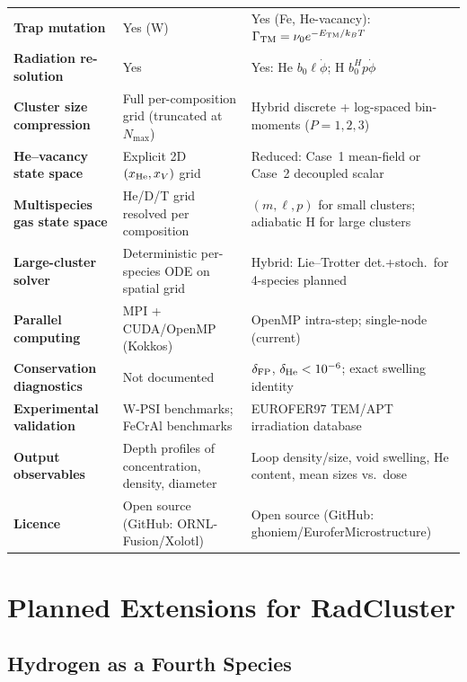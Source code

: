 \documentclass[12pt,letterpaper]{article}
\begin{document}
\begin{longtable}{@{}L{3.4cm} L{4.8cm} L{4.8cm}@{}}
\textbf{Trap mutation}
  & Yes (W)
  & Yes (Fe, He-vacancy): $\Gamma_{\rm TM} = \nu_0 e^{-E_{\rm TM}/k_BT}$ \\[3pt]
\textbf{Radiation re-solution}
  & Yes
  & Yes: He $b_0\ell\dot\phi$; {\color{plancolor}H $b_0^H p\dot\phi$} \\[3pt]
\textbf{Cluster size compression}
  & Full per-composition grid (truncated at $N_{\max}$)
  & Hybrid discrete + log-spaced bin-moments ($P = 1,2,3$) \\[3pt]
\textbf{He--vacancy state space}
  & Explicit 2D $(x_{\rm He},x_V)$ grid
  & Reduced: Case~1 mean-field or Case~2 decoupled scalar \\[3pt]
\textbf{Multispecies gas state space}
  & He/D/T grid resolved per composition
  & {\color{plancolor}$(m,\ell,p)$ for small clusters; adiabatic H for large clusters} \\[3pt]
\textbf{Large-cluster solver}
  & Deterministic per-species ODE on spatial grid
  & {\color{plancolor}Hybrid: Lie--Trotter det.+stoch.\ for 4-species planned} \\[3pt]
\textbf{Parallel computing}
  & MPI + CUDA/OpenMP (Kokkos)
  & OpenMP intra-step; single-node (current) \\[3pt]
\textbf{Conservation diagnostics}
  & Not documented
  & $\delta_{\rm FP}$, $\delta_{\rm He} < 10^{-6}$; exact swelling identity \\[3pt]
\textbf{Experimental validation}
  & W-PSI benchmarks; FeCrAl benchmarks
  & EUROFER97 TEM/APT irradiation database \\[3pt]
\textbf{Output observables}
  & Depth profiles of concentration, density, diameter
  & Loop density/size, void swelling, He content, mean sizes vs.\ dose \\[3pt]
\textbf{Licence}
  & Open source (GitHub: ORNL-Fusion/Xolotl)
  & Open source (GitHub: ghoniem/EuroferMicrostructure) \\
\end{longtable}

\section{Planned Extensions for RadCluster}
\label{sec:plans}

\subsection{Hydrogen as a Fourth Species}
\label{sec:plan_H}
\end{document}
